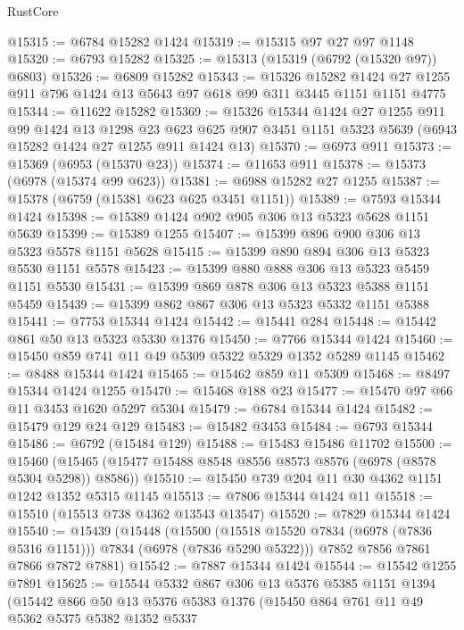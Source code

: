 \begin{lexlean}{RustCore}
\begin{coremodule}
@15315 := @6784 @15282 @1424
@15319 := @15315 @97 @27 @97 @1148
@15320 := @6793 @15282
@15325 := @15313 (@15319 (@6792 (@15320 @97)) @6803)
@15326 := @6809 @15282
@15343 := @15326
    @15282
    @1424
    @27
    @1255
    @911
    @796
    @1424
    @13
    @5643
    @97
    @618
    @99
    @311
    @3445
    @1151
    @1151
    @4775
@15344 := @11622 @15282
@15369 := @15326
    @15344
    @1424
    @27
    @1255
    @911
    @99
    @1424
    @13
    @1298
    @23
    @623
    @625
    @907
    @3451
    @1151
    @5323
    @5639
    (@6943 @15282 @1424 @27 @1255 @911 @1424 @13)
@15370 := @6973 @911
@15373 := @15369 (@6953 (@15370 @23))
@15374 := @11653 @911
@15378 := @15373 (@6978 (@15374 @99 @623))
@15381 := @6988 @15282 @27 @1255
@15387 := @15378 (@6759 (@15381 @623 @625 @3451 @1151))
@15389 := @7593 @15344 @1424
@15398 := @15389 @1424 @902 @905 @306 @13 @5323 @5628 @1151 @5639
@15399 := @15389 @1255
@15407 := @15399 @896 @900 @306 @13 @5323 @5578 @1151 @5628
@15415 := @15399 @890 @894 @306 @13 @5323 @5530 @1151 @5578
@15423 := @15399 @880 @888 @306 @13 @5323 @5459 @1151 @5530
@15431 := @15399 @869 @878 @306 @13 @5323 @5388 @1151 @5459
@15439 := @15399 @862 @867 @306 @13 @5323 @5332 @1151 @5388
@15441 := @7753 @15344 @1424
@15442 := @15441 @284
@15448 := @15442 @861 @50 @13 @5323 @5330 @1376
@15450 := @7766 @15344 @1424
@15460 := @15450 @859 @741 @11 @49 @5309 @5322 @5329 @1352 @5289 @1145
@15462 := @8488 @15344 @1424
@15465 := @15462 @859 @11 @5309
@15468 := @8497 @15344 @1424 @1255
@15470 := @15468 @188 @23
@15477 := @15470 @97 @66 @11 @3453 @1620 @5297 @5304
@15479 := @6784 @15344 @1424
@15482 := @15479 @129 @24 @129
@15483 := @15482 @3453
@15484 := @6793 @15344
@15486 := @6792 (@15484 @129)
@15488 := @15483 @15486 @11702
@15500 := @15460 (@15465 (@15477 @15488 @8548 @8556 @8573 @8576 (@6978 (@8578 @5304 @5298)) @8586))
@15510 := @15450 @739 @204 @11 @30 @4362 @1151 @1242 @1352 @5315 @1145
@15513 := @7806 @15344 @1424 @11
@15518 := @15510 (@15513 @738 @4362 @13543 @13547)
@15520 := @7829 @15344 @1424
@15540 := @15439
    (@15448
      (@15500 (@15518 @15520 @7834 (@6978 (@7836 @5316 @1151))) @7834 (@6978 (@7836 @5290 @5322)))
      @7852
      @7856
      @7861
      @7866
      @7872
      @7881)
@15542 := @7887 @15344 @1424
@15544 := @15542 @1255 @7891
@15625 := @15544
    @5332
    @867
    @306
    @13
    @5376
    @5385
    @1151
    @1394
    (@15442
      @866
      @50
      @13
      @5376
      @5383
      @1376
      (@15450
        @864
        @761
        @11
        @49
        @5362
        @5375
        @5382
        @1352
        @5337

\end{coremodule}
\end{lexlean}
